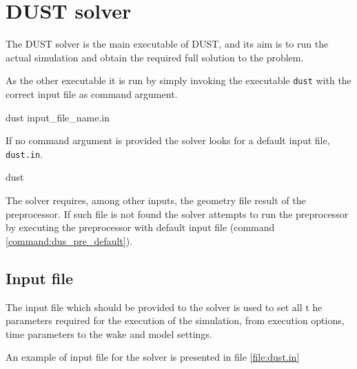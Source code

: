 \chapter{DUST solver}

The DUST solver is the main executable of DUST, and its aim is to run 
the actual simulation and obtain the required full solution to the problem. 

As the other executable it is run by simply invoking the executable \texttt{dust} with the correct input file as command argument.
\begin{command}[caption={Solver command looking for input file 
    \texttt{input\_file\_name.in}}]
    dust input_file_name.in
\end{command}

If no command argument is provided the solver looks for a default input file, \texttt{dust.in}. 
\begin{command}[caption={Solver command looking for 
default input file \texttt{dust.in}}]
    dust
\end{command}

The solver requires, among other inputs, the geometry file result of the preprocessor. 
If such file is not found the solver attempts to run the preprocessor by executing 
the preprocessor with default input file (command \ref{command:dus_pre_default}). 

\section{Input file}
\label{sec:Solver_InputFile}

The input file which should be provided to the solver is used to set all t
he parameters required for the execution of the simulation, 
from execution options, time parameters to the wake and model 
settings. 

An example of input file for the solver is presented in file \ref{file:dust.in}

